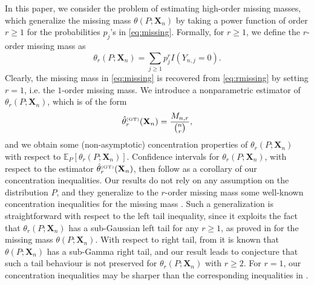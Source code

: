 \documentclass{article}
\newcommand{\1}{\boldsymbol{1}}
\theoremstyle{plain}
\begin{document}
In this paper, we consider the problem of estimating high-order missing masses, which generalize the missing mass $\theta(P;\mathbf{X}_{n})$ by taking a power function of order $r\geq1$ for the probabilities $p_{j}$'s in \eqref{eq:missing}. Formally, for $r\geq1$, we define the $r$-order missing mass as
\begin{equation} \label{eq:rmissing}
\theta_{r}(P;\mathbf{X}_{n})=\sum_{j\geq1}p^{r}_{j}I(Y_{n,j}=0).
\end{equation}
Clearly, the missing mass in \eqref{eq:missing} is recovered from \eqref{eq:rmissing} by setting $r=1$, i.e. the $1$-order missing mass. We introduce a nonparametric estimator of $\theta_r(P;\mathbf{X}_{n})$, which is of the form
\begin{displaymath}
\hat{\theta}_{r}^{\text{\tiny{(GT)}}}(\mathbf{X}_{n})= \frac{M_{n,r}}{{n\choose r}},
\end{displaymath}
and we obtain some (non-asymptotic) concentration properties of $\theta_r(P;\mathbf{X}_{n})$ with respect to $\mathbb{E}_{P}[\theta_r(P;\mathbf{X}_{n})]$. Confidence intervals for $\theta_r(P;\mathbf{X}_{n})$, with respect to the estimator $\hat{\theta}_{r}^{\text{\tiny{(GT)}}}(\mathbf{X}_{n})$, then follow as a corollary of our concentration inequalities. Our results do not rely on any assumption on the distribution $P$, and they generalize to the $r$-order missing mass some well-known concentration inequalities for the missing mass \cite{McA(03),Oha(12),Ben(17)}. Such a generalization is straightforward with respect to the left tail inequality, since it exploits the fact that $\theta_r(P;\mathbf{X}_{n})$ has a sub-Gaussian left tail for any $r\geq1$, as proved in \cite{McA(03),Ben(17)} for the missing mass $\theta(P;\mathbf{X}_{n})$. With respect to right tail, from \cite{Ben(17)} it is known that $\theta(P;\mathbf{X}_{n})$ has a sub-Gamma right tail, and our result leads to conjecture that such a tail behaviour is not preserved for $\theta_r(P;\mathbf{X}_{n})$ with $r\geq2$. For $r=1$, our concentration inequalities may be sharper than the corresponding inequalities in \cite{Ben(17)}. 
\end{document}
